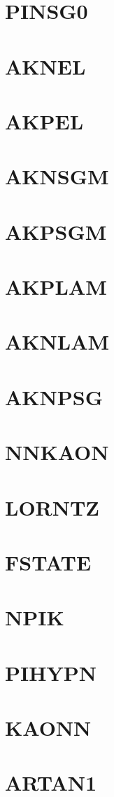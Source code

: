 \documentclass[10pt,UTF8]{ctexbook}
\begin{document}
\section{PINSG0}
\section{AKNEL}
\section{AKPEL}
\section{AKNSGM}
\section{AKPSGM}
\section{AKPLAM}
\section{AKNLAM}
\section{AKNPSG}
\section{NNKAON}
\section{LORNTZ}
\section{FSTATE}
\section{NPIK}
\section{PIHYPN}
\section{KAONN}
\section{ARTAN1}
\end{document}
